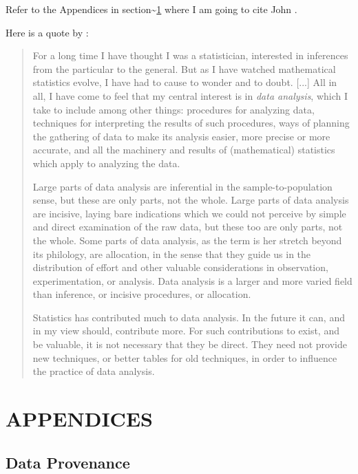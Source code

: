 \documentclass[]{article}
\begin{document}
\vspace{1.5in}

Refer to the Appendices in section\textasciitilde{}\ref{sec:appendix}
where I am going to cite John \citep[pp. 2-3]{Tukey:1962}.

Here is a quote by \citet[pp. 2-3]{Tukey:1962}:

\begin{quote}
For a long time I have thought I was a statistician, interested in inferences from the particular to the general.  But as I have watched mathematical statistics evolve, I have had to cause to wonder and to doubt. [...] All in all, I have come to feel that my central interest is in \emph{data analysis}, which I take to include among other things: procedures for analyzing data, techniques for interpreting the results of such procedures, ways of planning the gathering of data to make its analysis easier, more precise or more accurate, and all the machinery and results of (mathematical) statistics which apply to analyzing the data.

Large parts of data analysis are inferential in the sample-to-population sense, but these are only parts, not the whole.  Large parts of data analysis are incisive, laying bare indications which we could not perceive by simple and direct examination of the raw data, but these too are only parts, not the whole.  Some parts of data analysis, as the term is her stretch beyond its philology, are allocation, in the sense that they guide us in the distribution of effort and other valuable considerations in observation, experimentation, or analysis.  Data analysis is a larger and more varied field than inference, or incisive procedures, or allocation.

Statistics has contributed much to data analysis.  In the future it can, and in my view should, contribute more.  For such contributions to exist, and be valuable, it is not necessary that they be direct.  They need not provide new techniques, or better tables for old techniques, in order to influence the practice of data analysis.
\end{quote}

\newpage



\newpage
\section{APPENDICES}
\label{sec:appendix}

\subsection{Data Provenance}
\label{sec:appendix-data-provenance}
\end{document}
